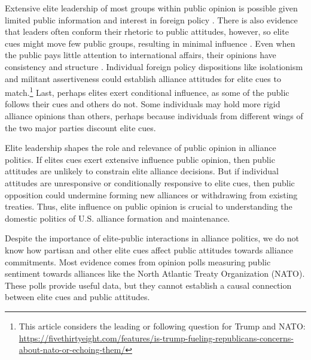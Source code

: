\documentclass[12pt]{article}
\begin{document}
Extensive elite leadership of most groups within public opinion is possible given limited public information and interest in foreign policy \citep{Canes-Wrone2006, BaumPotter2008, Druckman2014}.
There is also evidence that leaders often conform their rhetoric to public attitudes, however, so elite cues might move few public groups, resulting in minimal influence \citep{Barberaetal2019, HagerHilbig2020}.
Even when the public pays little attention to international affairs, their opinions have consistency and structure \citep{Holsti1992, PageShapiro1992}.
Individual foreign policy dispositions like isolationism and militant assertiveness \citep{Herrmannetal1999, KertzerZeitzoff2017} could establish alliance attitudes for elite cues to match.\footnote{This article considers the leading or following question for Trump and NATO: \url{https://fivethirtyeight.com/features/is-trump-fueling-republicans-concerns-about-nato-or-echoing-them/}}
Last, perhaps elites exert conditional influence, as some of the public follows their cues and others do not. 
Some individuals may hold more rigid alliance opinions than others, perhaps because individuals from different wings of the two major parties discount elite cues. 


Elite leadership shapes the role and relevance of public opinion in alliance politics.
If elites cues exert extensive influence public opinion, then public attitudes are unlikely to constrain elite alliance decisions.
But if individual attitudes are unresponsive or conditionally responsive to elite cues, then public opposition could undermine forming new alliances or withdrawing from existing treaties. 
Thus, elite influence on public opinion is crucial to understanding the domestic politics of U.S. alliance formation and maintenance.  


Despite the importance of elite-public interactions in alliance politics, we do not know how partisan and other elite cues affect public attitudes towards alliance commitments. 
Most evidence comes from opinion polls measuring public sentiment towards alliances like the North Atlantic Treaty Organization (NATO).
These polls provide useful data, but they cannot establish a causal connection between elite cues and public attitudes.
\end{document}
